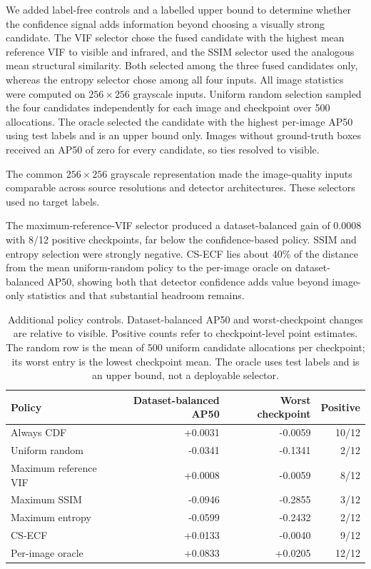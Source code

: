 \documentclass[preprint,11pt]{elsarticle}
\begin{document}
We added label-free controls and a labelled upper bound to determine whether
the confidence signal adds information beyond choosing a visually strong
candidate. The VIF selector chose the fused candidate with the highest mean
reference VIF to visible and infrared, and the SSIM selector used the analogous
mean structural similarity. Both selected among the three fused candidates
only, whereas the entropy selector chose among all four inputs. All image
statistics were computed on \(256\times256\) grayscale inputs. Uniform random
selection sampled the four candidates independently for each image and
checkpoint over 500 allocations. The oracle selected the candidate with the
highest per-image AP50 using test labels and is an upper bound only. Images
without ground-truth boxes received an AP50 of zero for every candidate, so
ties resolved to visible.

The common \(256\times256\) grayscale representation made the image-quality
inputs comparable across source resolutions and detector architectures. These
selectors used no target labels.

The maximum-reference-VIF selector produced a dataset-balanced gain of 0.0008
with 8/12 positive checkpoints, far below the confidence-based policy.
SSIM and entropy selection were strongly negative. CS-ECF lies about 40\% of
the distance from the mean uniform-random policy to the per-image oracle on
dataset-balanced AP50, showing both that detector confidence adds value beyond
image-only statistics and that substantial headroom remains.

\begin{table}[t]
\centering
\small
\caption{Additional policy controls. Dataset-balanced AP50 and worst-checkpoint
changes are relative to visible. Positive counts refer to checkpoint-level
point estimates. The random row is the mean of 500 uniform candidate
allocations per checkpoint; its worst entry is the lowest checkpoint mean.
The oracle uses test labels and is an upper bound, not a deployable selector.}
\label{tab:baselines}
\begin{tabular}{@{}lrrr@{}}
\toprule
Policy & Dataset-balanced AP50 & Worst checkpoint & Positive \\
\midrule
Always CDF & +0.0031 & -0.0059 & 10/12 \\
Uniform random & -0.0341 & -0.1341 & 2/12 \\
Maximum reference VIF & +0.0008 & -0.0059 & 8/12 \\
Maximum SSIM & -0.0946 & -0.2855 & 3/12 \\
Maximum entropy & -0.0599 & -0.2432 & 2/12 \\
CS-ECF & +0.0133 & -0.0040 & 9/12 \\
Per-image oracle & +0.0833 & +0.0205 & 12/12 \\
\bottomrule
\end{tabular}
\end{table}
\end{document}
